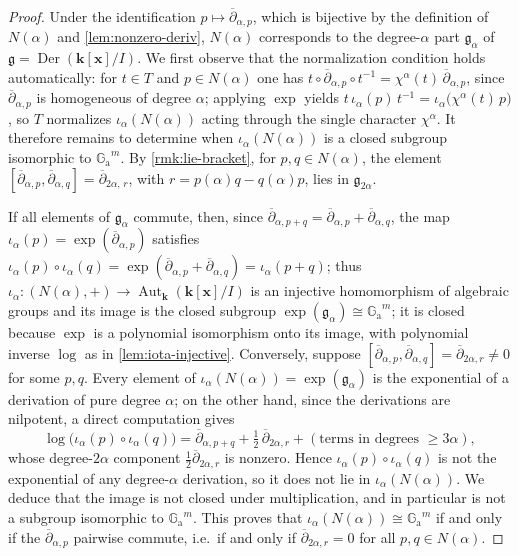 \documentclass[11pt,letterpaper,reqno]{amsart}
\theoremstyle{remark}
\theoremstyle{definition}
\def\XX{\mathbf{x}}
\newcommand{\KK}[0]{\ensuremath{\mathbf{k}}}
\newcommand{\GA}[0]{\ensuremath{\mathbb{G}_{\mathrm{a}}}}
\newcommand{\Aut}[0]{\ensuremath{\operatorname{Aut}}}
\newcommand{\Der}[0]{\ensuremath{\operatorname{Der}}}
\begin{document}
\begin{proof}
Under the identification
$p\mapsto\overline\partial_{\alpha,p}$, which is bijective by the definition of
$N(\alpha)$ and {\cref{lem:nonzero-deriv}}, $N(\alpha)$ corresponds to the degree-$\alpha$ part $\mathfrak g_\alpha$ of
$\mathfrak g=\Der(\KK[\XX]/I)$. We first observe that the normalization
condition holds automatically: for $t\in T$ and $p\in N(\alpha)$ one has
$t\circ\overline\partial_{\alpha,p}\circ t^{-1}
=\chi^{\alpha}(t)\,\overline\partial_{\alpha,p}$, since
$\overline\partial_{\alpha,p}$ is homogeneous of degree $\alpha$; applying
$\exp$ yields
$t\,\iota_\alpha(p)\,t^{-1}=\iota_\alpha\!\big(\chi^{\alpha}(t)\,p\big)$, so
$T$ normalizes $\iota_\alpha(N(\alpha))$ acting through the single character
$\chi^\alpha$. It therefore remains to determine when $\iota_\alpha(N(\alpha))$ is
a closed subgroup isomorphic to $\GA^m$. By \cref{rmk:lie-bracket}, for $p,q\in N(\alpha)$, the element $[\overline\partial_{\alpha,p},\overline\partial_{\alpha,q}]=\overline\partial_{2\alpha,\,r}$, with $r=p(\alpha)q-q(\alpha)p$, lies in $\mathfrak g_{2\alpha}$.

If all elements of $\mathfrak g_\alpha$ commute, then, since
$\overline\partial_{\alpha,p+q}=\overline\partial_{\alpha,p}+\overline\partial_{\alpha,q}$,
the map $\iota_\alpha(p)=\exp(\overline\partial_{\alpha,p})$ satisfies
$\iota_\alpha(p)\circ\iota_\alpha(q)=\exp(\overline\partial_{\alpha,p}
+\overline\partial_{\alpha,q})=\iota_\alpha(p+q)$; thus
$\iota_\alpha\colon(N(\alpha),+)\to\Aut_\KK(\KK[\XX]/I)$ is an injective
homomorphism of algebraic groups and its image is the closed subgroup
$\exp(\mathfrak g_\alpha)\cong\GA^m${; it is closed
because $\exp$ is a polynomial isomorphism onto its image, with polynomial
inverse $\log$ as in \cref{lem:iota-injective}}. Conversely, suppose
$[\overline\partial_{\alpha,p},\overline\partial_{\alpha,q}]
=\overline\partial_{2\alpha,r}\neq0$ for some $p,q$. Every element of
$\iota_\alpha(N(\alpha))=\exp(\mathfrak g_\alpha)$ is the exponential of a derivation of
pure degree $\alpha$; on the other hand, since the derivations are nilpotent, a direct computation gives
$$
  \log\!\big(\iota_\alpha(p)\circ\iota_\alpha(q)\big)
  =\overline\partial_{\alpha,p+q}+\tfrac12\,\overline\partial_{2\alpha,r}
   +(\text{terms in degrees }\ge 3\alpha),
$$
whose degree-$2\alpha$ component $\tfrac12\overline\partial_{2\alpha,r}$ is
nonzero. Hence $\iota_\alpha(p)\circ\iota_\alpha(q)$ is not the exponential of
any degree-$\alpha$ derivation, so it does not lie in
$\iota_\alpha(N(\alpha))$. We deduce that the image is not closed under multiplication, and in
particular is not a subgroup isomorphic to $\GA^m$. This proves that
$\iota_\alpha(N(\alpha))\cong\GA^m$ if and only if the
$\overline\partial_{\alpha,p}$ pairwise commute, i.e.\ if and only if
$\overline\partial_{2\alpha,r}=0$ for all $p,q\in N(\alpha)$.


\end{proof}
\end{document}
